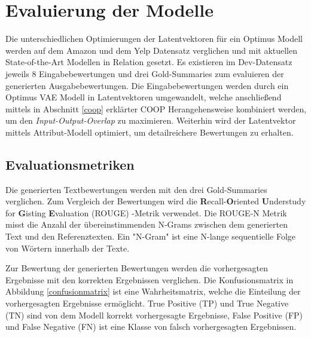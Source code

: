 \section{Evaluierung der Modelle}\raggedbottom
\label{evalmetric}
Die unterschiedlichen Optimierungen der Latentvektoren für ein Optimus Modell werden auf dem Amazon und dem Yelp Datensatz verglichen und mit aktuellen State-of-the-Art Modellen in Relation gesetzt.
Es existieren im Dev-Datensatz jeweils 8 Eingabebewertungen und drei Gold-Summaries zum evaluieren der generierten Ausgabebewertungen.
Die Eingabebewertungen werden durch ein Optimus VAE Modell in Latentvektoren umgewandelt, welche anschließend mittels in Abschnitt \ref{coop} erklärter COOP Herangehensweise kombiniert werden, um den \textit{Input-Output-Overlap} zu maximieren. 
Weiterhin wird der Latentvektor mittels Attribut-Modell optimiert, um detailreichere Bewertungen zu erhalten.


\subsection{Evaluationsmetriken}
Die generierten Textbewertungen werden mit den drei Gold-Summaries verglichen.
Zum Vergleich der Bewertungen wird die \textbf{R}ecall-\textbf{O}riented \textbf{U}nderstudy for \textbf{G}isting \textbf{E}valuation (ROUGE) -Metrik verwendet.
Die ROUGE-N Metrik misst die Anzahl der übereinstimmenden N-Grams zwischen dem generierten Text und den Referenztexten. 
Ein "N-Gram" ist eine N-lange sequentielle Folge von Wörtern innerhalb der Texte. 

Zur Bewertung der generierten Bewertungen werden die vorhergesagten Ergebnisse mit den korrekten Ergebnissen verglichen. 
Die Konfusionsmatrix in Abbildung \ref{confusionmatrix} ist eine Wahrheitsmatrix, welche die Einteilung der vorhergesagten Ergebnisse ermöglicht. 
True Positive (TP) und True Negative (TN) sind von dem Modell korrekt vorhergesagte Ergebnisse, False Positive (FP) und False Negative (FN) ist eine Klasse von falsch vorhergesagten Ergebnissen.


